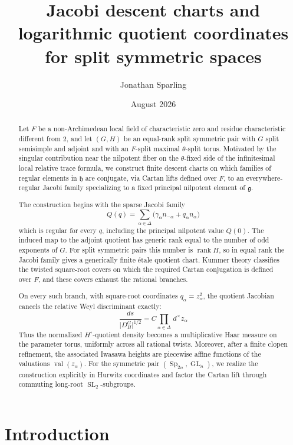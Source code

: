 \documentclass[11pt]{amsart}
\title[Jacobi descent charts]
{Jacobi descent charts and logarithmic quotient coordinates\\
for split symmetric spaces}
\author{Jonathan Sparling}
\date{August 2026}
\theoremstyle{definition}
\theoremstyle{remark}
\newcommand{\dmeas}{\,d^{\times}}
\newcommand{\abs}[1]{\lvert #1\rvert}
\begin{document}
\begin{abstract}
Let $F$ be a non-Archimedean local field of characteristic zero and residue characteristic different from $2$, and let $(G,H)$ be an equal-rank split symmetric pair with $G$ split semisimple and adjoint and with an $F$-split maximal $\theta$-split torus. Motivated by the singular contribution near the nilpotent fiber on the $\theta$-fixed side of the infinitesimal local relative trace formula, we construct finite descent charts on which families of regular elements in $\mathfrak{h}$ are conjugate, via Cartan lifts defined over $F$, to an everywhere-regular Jacobi family specializing to a fixed principal nilpotent element of $\mathfrak{g}$.

The construction begins with the sparse Jacobi family
\[
Q(q)=\sum_{\alpha\in\Delta}
\bigl(\gamma_\alpha n_{-\alpha}+q_\alpha n_\alpha\bigr)
\]
which is regular for every $q$, including the principal nilpotent value $Q(0)$. The induced map to the adjoint quotient has generic rank equal to the number of odd exponents of $G$. For split symmetric pairs this number is $\operatorname{rank}H$, so in equal rank the Jacobi family gives a generically finite \'etale quotient chart. Kummer theory classifies the twisted square-root covers on which the required Cartan conjugation is defined over $F$, and these covers exhaust the rational branches.

On every such branch, with square-root coordinates $q_\alpha=z_\alpha^2$, the quotient Jacobian cancels the relative Weyl discriminant exactly:
\[
\frac{ds}{\abs{D_H^G}^{1/2}}
=
C\prod_{\alpha\in\Delta}\dmeas z_\alpha
\]
Thus the normalized $H^\circ$-quotient density becomes a multiplicative Haar measure on the parameter torus, uniformly across all rational twists. Moreover, after a finite clopen refinement, the associated Iwasawa heights are piecewise affine functions of the valuations $\operatorname{val}(z_\alpha)$. For the symmetric pair $(\operatorname{Sp}_{2n},\operatorname{GL}_n)$, we realize the construction explicitly in Hurwitz coordinates and factor the Cartan lift through commuting long-root $\operatorname{SL}_2$-subgroups.
\end{abstract}

\maketitle
\tableofcontents

\section{Introduction}
\end{document}
